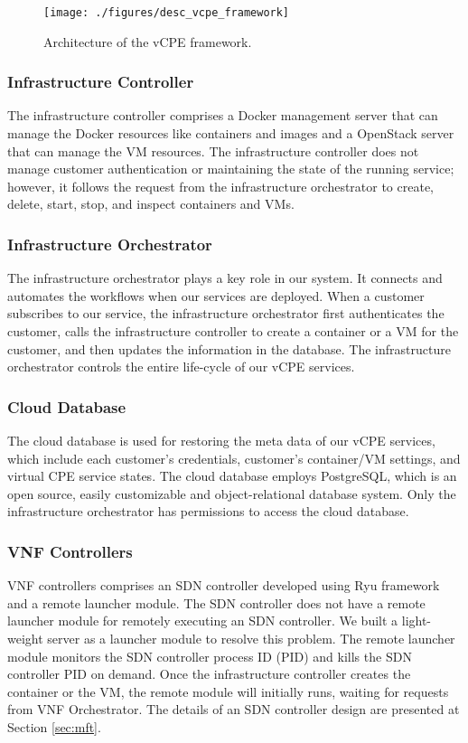 \documentclass[journal]{IEEEtran}
\begin{document}
\begin{figure}[!t]
\centering
\texttt{[image: ./figures/desc\_vcpe\_framework]}
\caption{Architecture of the vCPE framework.}
\label{fig:desc_vcpe_framework}
\end{figure}

\subsubsection{Infrastructure Controller}

The infrastructure controller comprises a Docker management server that can manage the Docker resources like containers and images and a OpenStack server that can manage the VM resources. The infrastructure controller does not manage customer authentication or maintaining the state of the running service; however, it follows the request from the infrastructure orchestrator to create, delete, start, stop, and inspect containers and VMs.

\subsubsection{Infrastructure Orchestrator}
The infrastructure orchestrator plays a key role in our system. It connects and automates the workflows when our services are deployed. When a customer subscribes to our service, the infrastructure orchestrator first authenticates the customer, calls the infrastructure controller to create a container or a VM for the customer, and then updates the information in the database. The infrastructure orchestrator controls the entire life-cycle of our vCPE services.

\subsubsection{Cloud Database}
The cloud database is used for restoring the meta data of our vCPE services, which include each customer’s credentials, customer’s container/VM settings, and virtual CPE service states. The cloud database employs PostgreSQL, which is an open source, easily customizable and object-relational database system. Only the infrastructure orchestrator has permissions to access the cloud database.

\subsubsection{VNF Controllers}
VNF controllers comprises an SDN controller developed using Ryu framework \cite{web:ryu} and a remote launcher module. The SDN controller does not have a remote launcher module for remotely executing an SDN controller. We built a light-weight server as a launcher module to resolve this problem. The remote launcher module monitors the SDN controller process ID (PID) and kills the SDN controller PID on demand. Once the infrastructure controller  creates the container or the VM, the remote module will initially runs, waiting for requests from VNF Orchestrator. The details of an SDN controller design are presented at Section \ref{sec:mft}.
\end{document}
